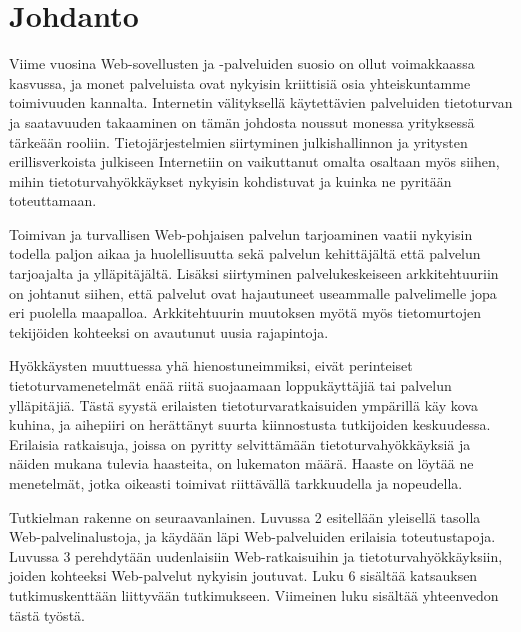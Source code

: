 
\chapter{Johdanto}

Viime vuosina Web-sovellusten ja -palveluiden suosio on 
ollut voimakkaassa kasvussa, ja monet palveluista ovat nykyisin kriittisiä osia
yhteiskuntamme toimivuuden kannalta. Internetin välityksellä
käytettävien palveluiden tietoturvan ja saatavuuden takaaminen on
tämän johdosta noussut monessa yrityksessä tärkeään rooliin.
Tietojärjestelmien siirtyminen julkishallinnon ja
yritysten erillisverkoista julkiseen Internetiin on vaikuttanut omalta
osaltaan myös siihen, mihin tietoturvahyökkäykset nykyisin
kohdistuvat ja kuinka ne pyritään toteuttamaan.

Toimivan ja turvallisen Web-pohjaisen palvelun tarjoaminen vaatii
nykyisin todella paljon aikaa ja huolellisuutta sekä palvelun
kehittäjältä että palvelun tarjoajalta ja ylläpitäjältä. Lisäksi
siirtyminen palvelukeskeiseen arkkitehtuuriin on johtanut siihen, että
palvelut ovat hajautuneet useammalle palvelimelle jopa eri puolella
maapalloa. Arkkitehtuurin muutoksen myötä myös tietomurtojen
tekijöiden kohteeksi on avautunut uusia rajapintoja.

Hyökkäysten muuttuessa yhä hienostuneimmiksi, eivät perinteiset
tietoturvamenetelmät enää riitä suojaamaan loppukäyttäjiä tai palvelun
ylläpitäjiä. Tästä syystä erilaisten tietoturvaratkaisuiden ympärillä
käy kova kuhina, ja aihepiiri on herättänyt suurta kiinnostusta
tutkijoiden keskuudessa. Erilaisia ratkaisuja, joissa on pyritty
selvittämään tietoturvahyökkäyksiä ja näiden mukana tulevia haasteita,
on lukematon määrä. Haaste on löytää ne menetelmät, jotka oikeasti
toimivat riittävällä tarkkuudella ja nopeudella.

Tutkielman rakenne on seuraavanlainen. Luvussa 2 esitellään yleisellä
tasolla Web-palvelinalustoja, ja käydään läpi Web-palveluiden
erilaisia toteutustapoja. Luvussa 3 perehdytään uudenlaisiin
Web-ratkaisuihin ja tietoturvahyökkäyksiin, joiden kohteeksi
Web-palvelut nykyisin joutuvat. Luku 6 sisältää katsauksen
tutkimuskenttään liittyvään tutkimukseen. Viimeinen luku sisältää
yhteenvedon tästä työstä.
